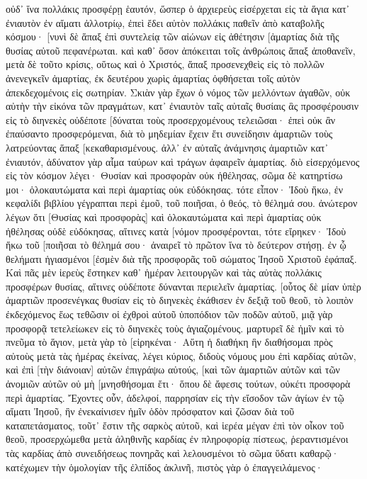 οὐδ᾽ ἵνα πολλάκις προσφέρῃ ἑαυτόν, ὥσπερ ὁ ἀρχιερεὺς εἰσέρχεται εἰς τὰ ἅγια κατ᾽ ἐνιαυτὸν ἐν αἵματι ἀλλοτρίῳ, 
ἐπεὶ ἔδει αὐτὸν πολλάκις παθεῖν ἀπὸ καταβολῆς κόσμου· [νυνὶ δὲ ἅπαξ ἐπὶ συντελείᾳ τῶν αἰώνων εἰς ἀθέτησιν [ἁμαρτίας διὰ τῆς θυσίας αὐτοῦ πεφανέρωται. 
καὶ καθ᾽ ὅσον ἀπόκειται τοῖς ἀνθρώποις ἅπαξ ἀποθανεῖν, μετὰ δὲ τοῦτο κρίσις, 
οὕτως καὶ ὁ Χριστός, ἅπαξ προσενεχθεὶς εἰς τὸ πολλῶν ἀνενεγκεῖν ἁμαρτίας, ἐκ δευτέρου χωρὶς ἁμαρτίας ὀφθήσεται τοῖς αὐτὸν ἀπεκδεχομένοις εἰς σωτηρίαν. 
Σκιὰν γὰρ ἔχων ὁ νόμος τῶν μελλόντων ἀγαθῶν, οὐκ αὐτὴν τὴν εἰκόνα τῶν πραγμάτων, κατ᾽ ἐνιαυτὸν ταῖς αὐταῖς θυσίαις ἃς προσφέρουσιν εἰς τὸ διηνεκὲς οὐδέποτε [δύναται τοὺς προσερχομένους τελειῶσαι· 
ἐπεὶ οὐκ ἂν ἐπαύσαντο προσφερόμεναι, διὰ τὸ μηδεμίαν ἔχειν ἔτι συνείδησιν ἁμαρτιῶν τοὺς λατρεύοντας ἅπαξ [κεκαθαρισμένους. 
ἀλλ᾽ ἐν αὐταῖς ἀνάμνησις ἁμαρτιῶν κατ᾽ ἐνιαυτόν, 
ἀδύνατον γὰρ αἷμα ταύρων καὶ τράγων ἀφαιρεῖν ἁμαρτίας. 
διὸ εἰσερχόμενος εἰς τὸν κόσμον λέγει· Θυσίαν καὶ προσφορὰν οὐκ ἠθέλησας, σῶμα δὲ κατηρτίσω μοι· 
ὁλοκαυτώματα καὶ περὶ ἁμαρτίας οὐκ εὐδόκησας. 
τότε εἶπον· Ἰδοὺ ἥκω, ἐν κεφαλίδι βιβλίου γέγραπται περὶ ἐμοῦ, τοῦ ποιῆσαι, ὁ θεός, τὸ θέλημά σου. 
ἀνώτερον λέγων ὅτι [Θυσίας καὶ προσφορὰς] καὶ ὁλοκαυτώματα καὶ περὶ ἁμαρτίας οὐκ ἠθέλησας οὐδὲ εὐδόκησας, αἵτινες κατὰ [νόμον προσφέρονται, 
τότε εἴρηκεν· Ἰδοὺ ἥκω τοῦ [ποιῆσαι τὸ θέλημά σου· ἀναιρεῖ τὸ πρῶτον ἵνα τὸ δεύτερον στήσῃ. 
ἐν ᾧ θελήματι ἡγιασμένοι [ἐσμὲν διὰ τῆς προσφορᾶς τοῦ σώματος Ἰησοῦ Χριστοῦ ἐφάπαξ. 
Καὶ πᾶς μὲν ἱερεὺς ἕστηκεν καθ᾽ ἡμέραν λειτουργῶν καὶ τὰς αὐτὰς πολλάκις προσφέρων θυσίας, αἵτινες οὐδέποτε δύνανται περιελεῖν ἁμαρτίας. 
[οὗτος δὲ μίαν ὑπὲρ ἁμαρτιῶν προσενέγκας θυσίαν εἰς τὸ διηνεκὲς ἐκάθισεν ἐν δεξιᾷ τοῦ θεοῦ, 
τὸ λοιπὸν ἐκδεχόμενος ἕως τεθῶσιν οἱ ἐχθροὶ αὐτοῦ ὑποπόδιον τῶν ποδῶν αὐτοῦ, 
μιᾷ γὰρ προσφορᾷ τετελείωκεν εἰς τὸ διηνεκὲς τοὺς ἁγιαζομένους. 
μαρτυρεῖ δὲ ἡμῖν καὶ τὸ πνεῦμα τὸ ἅγιον, μετὰ γὰρ τὸ [εἰρηκέναι· 
Αὕτη ἡ διαθήκη ἣν διαθήσομαι πρὸς αὐτοὺς μετὰ τὰς ἡμέρας ἐκείνας, λέγει κύριος, διδοὺς νόμους μου ἐπὶ καρδίας αὐτῶν, καὶ ἐπὶ [τὴν διάνοιαν] αὐτῶν ἐπιγράψω αὐτούς, 
[καὶ τῶν ἁμαρτιῶν αὐτῶν καὶ τῶν ἀνομιῶν αὐτῶν οὐ μὴ [μνησθήσομαι ἔτι· 
ὅπου δὲ ἄφεσις τούτων, οὐκέτι προσφορὰ περὶ ἁμαρτίας. 
Ἔχοντες οὖν, ἀδελφοί, παρρησίαν εἰς τὴν εἴσοδον τῶν ἁγίων ἐν τῷ αἵματι Ἰησοῦ, 
ἣν ἐνεκαίνισεν ἡμῖν ὁδὸν πρόσφατον καὶ ζῶσαν διὰ τοῦ καταπετάσματος, τοῦτ᾽ ἔστιν τῆς σαρκὸς αὐτοῦ, 
καὶ ἱερέα μέγαν ἐπὶ τὸν οἶκον τοῦ θεοῦ, 
προσερχώμεθα μετὰ ἀληθινῆς καρδίας ἐν πληροφορίᾳ πίστεως, ῥεραντισμένοι τὰς καρδίας ἀπὸ συνειδήσεως πονηρᾶς καὶ λελουσμένοι τὸ σῶμα ὕδατι καθαρῷ· 
κατέχωμεν τὴν ὁμολογίαν τῆς ἐλπίδος ἀκλινῆ, πιστὸς γὰρ ὁ ἐπαγγειλάμενος· 
